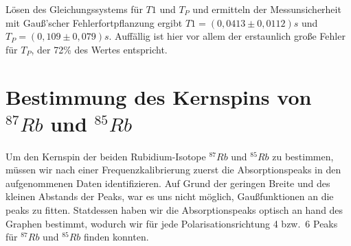\documentclass[bigchapter,colorback,accentcolor=tud4b,linedtoc,11pt]{tudreport}
\begin{document}
Lösen des Gleichungssystems für $T1$ und $T_P$ und ermitteln der
Messunsicherheit mit Gauß'scher Fehlerfortpflanzung ergibt $T1=(0,0413 \pm
0,0112)s$ und $T_P=(0,109 \pm 0,079)s$. Auffällig ist hier vor allem der
erstaunlich große Fehler für $T_P$, der 72\% des Wertes entspricht.

\section{Bestimmung des Kernspins von $^{87}Rb$ und $^{85}Rb$}
Um den Kernspin der beiden Rubidium-Isotope $^{87}Rb$ und $^{85}Rb$ zu
bestimmen, müssen wir nach einer Frequenzkalibrierung zuerst die
Absorptionspeaks in den aufgenommenen Daten identifizieren. Auf Grund der
geringen Breite und des kleinen Abstands der Peaks, war es uns nicht möglich,
Gaußfunktionen an die peaks zu fitten. Statdessen haben wir die Absorptionspeaks
optisch an hand des Graphen bestimmt, wodurch wir für jede Polarisationsrichtung
4 bzw.\ 6 Peaks für $^{87}Rb$ und $^{85}Rb$ finden konnten.
\end{document}

